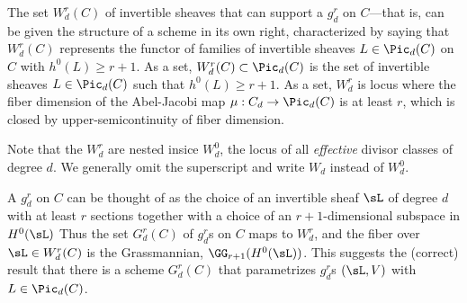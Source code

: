 
The set $W^r_d(C)$ of  invertible sheaves that can support a $g^r_d$ on $C$---that is, can be given the structure of a scheme in its own right, characterized by saying that
$W^r_d(C)$ represents the functor of families of invertible sheaves $L \in \Pic_d(C)$ on $C$ with  $h^0(L) \geq r+1$.
As a set,
 $W^r_d(C) \subset \Pic_d(C)$ is the set of invertible sheaves $L \in \Pic_d(C)$ such that $h^0(L) \geq r+1$. As a set, $W^r_d$ is locus where the fiber dimension of the Abel-Jacobi map $\mu : C_d \to \Pic_d(C)$ is at least $r$, which is closed by upper-semicontinuity of fiber dimension. 



Note that  the $W^r_d$ are nested insice $W^0_d$, the locus of all \emph{effective} divisor classes of degree $d$. We generally omit the superscript and write $W_d$ instead of $W^0_d$.

A $g^r_d$ on $C$ can be thought of as the choice of an invertible sheaf $\sL$ of degree $d$ with at least $r$ sections together with a choice of an $r+1$-dimensional subspace in $H^0(\sL)$ Thus the set
$G^r_d(C)$ of $g^r_d$s on $C$ maps to $W^r_d$, and the fiber over $\sL \in W^r_d(C)$ is the Grassmannian, $\GG_{r+1}(H^0(\sL))$. This suggests the (correct) result that there is a scheme  $G^r_d(C)$  that parametrizes $g^r_d$s  $(\sL, V)$ with $L \in \Pic_d(C)$. 

